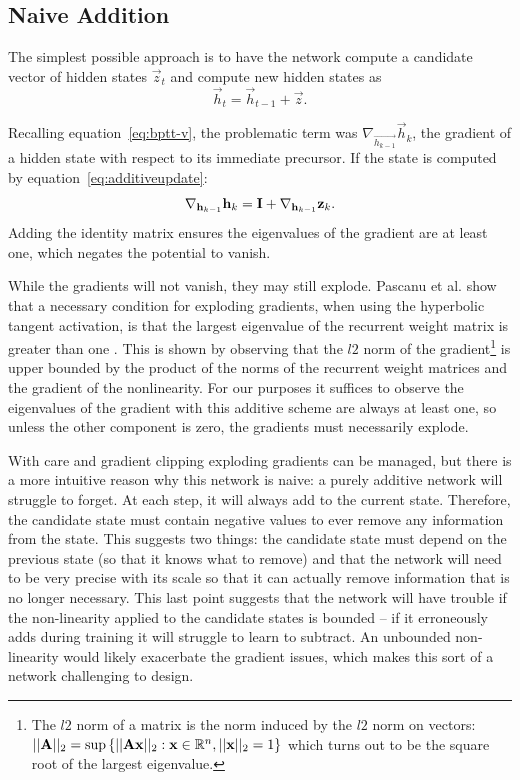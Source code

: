 \subsection{Naive Addition}
The simplest possible approach is to have the network compute a candidate vector of hidden states
\(\vec{z}_t\) and compute new hidden states as
\begin{equation}\label{eq:additiveupdate}
	\vec{h}_t = \vec{h}_{t-1} + \vec{z}.
\end{equation}

Recalling equation~\eqref{eq:bptt-v}, the problematic term was \(\nabla_{\vec{h_{k-1}}}\vec{h}_k\),
the gradient of a hidden state with respect to its immediate precursor. If the state is computed by
equation~\eqref{eq:additiveupdate}:
\begin{equation}
	\nabla_{\mathbf{h}_{k-1}}\mathbf{h}_k = \mathbf{I} + \nabla_{\mathbf{h}_{k-1}}\mathbf{z}_k.
\end{equation} Adding the identity matrix ensures the eigenvalues of the gradient are at least
one, which negates the potential to vanish.

While the gradients will not vanish, they may still explode. Pascanu et al. show that a necessary
condition for exploding gradients, when using the hyperbolic tangent activation, is that the largest
eigenvalue of the recurrent weight matrix is greater than one \autocite{Pascanu2012}. This is shown by
observing that the \(l2\) norm of the gradient\footnote{
The \(l2\) norm of a matrix is the norm induced by the \(l2\) norm on vectors:\\
\(||\mathbf{A}||_2 = \sup \left\{||\mathbf{Ax}||_2: \mathbf{x} \in \mathbb{R}^n, ||\mathbf{x}||_2 = 1 \right\}\)
which turns out to be the square root of the largest eigenvalue.} is upper bounded by the product of the
norms of the recurrent weight matrices and the gradient of the nonlinearity. For our purposes it suffices
to observe the eigenvalues of the gradient with this additive scheme are always at least one, so unless
the other component is zero, the gradients must necessarily explode.

With care and gradient clipping \autocite{Pascanu2012} exploding gradients can be managed, but there
is a more intuitive reason why this network is naive: a purely additive
network will struggle to forget. At each step, it will always add to the current state. Therefore,
the candidate state must contain negative values to ever remove any information from the state. This
suggests two things: the candidate state must depend on the previous state (so that it knows what to
remove) and that the network will need to be very precise with its scale so that it can
actually remove information that is no longer necessary. This last point suggests that the network
will have trouble if the non-linearity applied to the candidate states is bounded -- if it erroneously
adds during training it will struggle to learn to subtract. An unbounded non-linearity would likely
exacerbate the gradient issues, which makes this sort of a network challenging to design.


